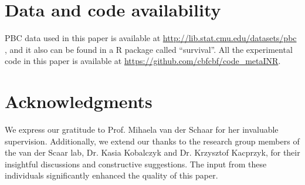 \documentclass{article}
\begin{document}
\section*{Data and code availability}
PBC data used in this paper is available at \url{http://lib.stat.cmu.edu/datasets/pbc} , and it also can be found in a R package called ``survival''.
All the experimental code in this paper is available at \url{https://github.com/cbfcbf/code\_metaINR}.

\section*{Acknowledgments}
We express our gratitude to Prof. Mihaela van der Schaar for her invaluable supervision. 
Additionally, we extend our thanks to the research group members of the van der Scaar lab, Dr. Kasia Kobalczyk and Dr. Krzysztof Kacprzyk, for their insightful discussions and constructive suggestions. 
The input from these individuals significantly enhanced the quality of this paper.






\end{document}

